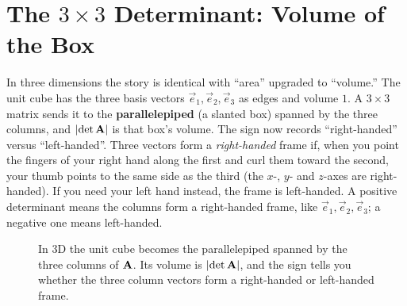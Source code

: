 \section{The $3\times 3$ Determinant: Volume of the Box}
\label{ch21:3x3}

In three dimensions the story is identical with ``area'' upgraded to
``volume.'' The unit cube has the three basis vectors $\vec e_1, \vec e_2, \vec
e_3$ as edges and volume $1$. A $3\times 3$ matrix sends it to the
\textbf{parallelepiped} (a slanted box) spanned by the three columns, and
$\lvert\det\mathbf{A}\rvert$ is that box's volume. The sign now records ``right-handed''
versus ``left-handed''. Three vectors form a \emph{right-handed} frame if, when
you point the fingers of your right hand along the first and curl them toward the
second, your thumb points to the same side as the third (the $x$-, $y$- and
$z$-axes are right-handed). If you need your left hand instead, the frame is
left-handed. A positive determinant means the columns form a right-handed frame,
like $\vec e_1,\vec e_2,\vec e_3$; a negative one means left-handed.

\begin{figure}[H]
\centering
{}
\caption{In $3$D the unit cube becomes the parallelepiped spanned by the three
columns of $\mathbf{A}$. Its volume is $\lvert\det\mathbf{A}\rvert$, and the sign tells you
whether the three column vectors form a right-handed or left-handed frame.}
\label{ch21:fig-parallelepiped}
\end{figure}

